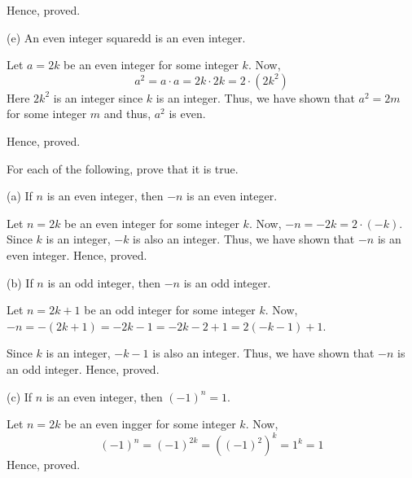 \begin{problem}
\begin{solution}
		Hence, proved.
	\end{solution}
	
	(e) An even integer squaredd is an even integer.
	\begin{solution}
		Let $a = 2k$ be an even integer for some integer $k$. Now,
		$$a^2 = a \cdot a = 2k \cdot 2k = 2 \cdot (2k^2)$$
		Here $2k^2$ is an integer since $k$ is an integer. Thus, we have shown that $a^2 = 2m$ for some integer $m$ and thus, $a^2$ is even.

		Hence, proved.
	\end{solution}

\end{problem}


\begin{problem}
	For each of the following, prove that it is true.

	(a) If $n$ is an even integer, then $-n$ is an even integer.
	\begin{solution}
		Let $n = 2k$ be an even integer for some integer $k$. Now, $-n = -2k = 2 \cdot (-k)$. Since $k$ is an integer, $-k$ is also an integer. Thus, we have shown that $-n$ is an even integer. Hence, proved.
	\end{solution}

	(b) If $n$ is an odd integer, then $-n$ is an odd integer.
	\begin{solution}
		Let $n = 2k+1$ be an odd integer for some integer $k$. Now, $-n = -(2k+1) =-2k-1 = -2k-2+1 = 2(-k-1) + 1$.

		Since $k$ is an integer, $-k-1$ is also an integer. Thus, we have shown that $-n$ is an odd integer. Hence, proved.
	\end{solution}

	(c) If $n$ is an even integer, then $(-1)^n = 1$.
	\begin{solution}
		Let $n = 2k$ be an even ingger for some integer $k$. Now, 
		$$(-1)^n = (-1)^{2k} = ((-1)^2)^k = 1^k = 1$$
		Hence, proved.
	\end{solution}
\end{problem}

